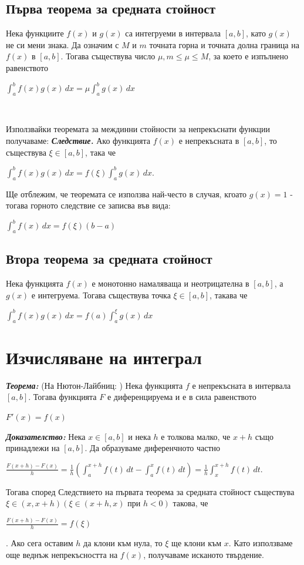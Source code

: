 \documentclass[11pt]{article} %
\newcommand{\italicBold}[1]{\textbf{\emph{#1}}}
\newcommand{\theorem}{\italicBold{Теорема: }}
\newcommand{\proof}{\italicBold{Доказателство: }}
\newcommand{\integral}[4]{\displaystyle \int_{#1}^{#2}#3\,#4}
\begin{document}
\subsection{Първа теорема за средната стойност}
Нека функциите $f(x)$ и $g(x)$ са интегруеми в интервала $[a,b]$, като $g(x)$ не си мени знака. Да означим с $M$ и $m$ точната горна и точната долна граница на $f(x)$ в $[a,b]$. Тогава съществува число $\mu, m \leq \mu \leq M$, за което е изпълнено равенството\\
\centerline{$\integral{a}{b}{f(x)g(x)}{dx} = \mu \integral{a}{b}{g(x)}{dx}$}\\\par

Използвайки теоремата за междинни стойности за непрекъснати функции получаваме:
\italicBold{Следствие. }Ако функцията $f(x)$ е непрекъсната в $[a,b]$, то съществува $\xi \in [a,b]$, така че\\
\centerline{$\integral{a}{b}{f(x)g(x)}{dx} = f(\xi)\integral{a}{b}{g(x)}{dx}$.}
Ще отблежим, че теоремата се използва най-често в случая, кгоато $g(x) = 1$ - тогава горното следствие се записва във вида:\\
\centerline{$\integral{a}{b}{f(x)}{dx}=f(\xi)(b-a)$}

\subsection{Втора теорема за средната стойност}
Нека функцията $f(x)$ е монотонно намаляваща и неотрицателна в $[a,b]$, а $g(x)$ е интегруема. Тогава съществува точка $\xi \in [a,b]$, такава че\\
\centerline{$\integral{a}{b}{f(x)g(x)}{dx} = f(a)\integral{a}{\xi}{g(x)}{dx}$}

\section{Изчисляване на интеграл}
\theorem (На Нютон-Лайбниц: ) Нека функцията $f$ е непрекъсната в интервала $[a,b]$. Тогава функцията $F$ е диференцируема и е в сила равенството\\
\centerline{$F'(x)=f(x)$}
\proof Нека $x \in [a,b]$ и нека $h$ е толкова малко, че $x+h$ също принадлежи на $[a,b]$. Да образуваме диференчното частно\\
\centerline{$\displaystyle \frac{F(x+h)-F(x)}{h}=\frac{1}{h}(\integral{a}{x+h}{f(t)}{dt}-\integral{a}{x}{f(t)}{dt})=\frac{1}{h}\integral{x}{x+h}{f(t)}{dt}$.}

Тогава според Следствието на първата теорема за средната стойност съществува $\xi \in (x, x+h)(\xi \in (x+h,x) \text{ при } h<0)$ такова, че \\
\centerline{$\frac{F(x+h)-F(x)}{h}=f(\xi)$}.
Ако сега оставим $h$ да клони към нула, то $\xi$ ще клони към $x$. Като използваме още веднъж непрекъсността на $f(x)$, получаваме исканото твърдение.\\\par
\end{document}
